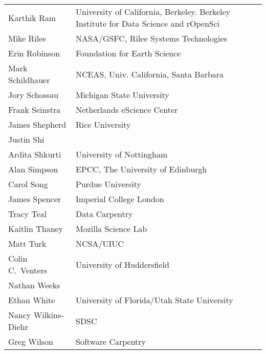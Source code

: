 \documentclass[11pt, oneside]{amsart}
\begin{document}
{\begin{longtable}{ll}
\\ Karthik Ram           &  University of California, Berkeley. Berkeley Institute for Data Science and rOpenSci
\\ Mike Rilee            &  NASA/GSFC, Rilee Systems Technologies
\\ Erin Robinson         &  Foundation for Earth Science
\\ Mark Schildhauer      &  NCEAS, Univ. California, Santa Barbara
\\ Jory Schossau         &  Michigan State University
\\ Frank Seinstra        &  Netherlands eScience Center
\\ James Shepherd        &  Rice University
\\ Justin Shi
\\ Ardita Shkurti        &  University of Nottingham
\\ Alan Simpson          &  EPCC, The University of Edinburgh
\\ Carol Song            &  Purdue University
\\ James Spencer         &  Imperial College London
\\ Tracy Teal            &  Data Carpentry
\\ Kaitlin Thaney        &  Mozilla Science Lab
\\ Matt Turk             &  NCSA/UIUC
\\ Colin C.~Venters      &  University of Huddersfield
\\ Nathan Weeks
\\ Ethan White           &  University of Florida/Utah State University
\\ Nancy Wilkins-Diehr   &  SDSC
\\ Greg Wilson           &  Software Carpentry
\end{longtable}
}




\end{document}
